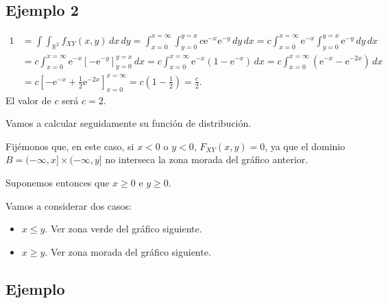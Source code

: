 \documentclass[]{book}
\begin{document}
\hypertarget{ejemplo-2-2}{%
\subsection{Ejemplo 2}\label{ejemplo-2-2}}

\[
\begin{array}{rl}
1 & =\int\int_{\mathbb{R}^2}f_{XY}(x,y)\, dx\, dy=\int_{x=0}^{x=\infty}\int_{y=0}^{y=x} c \mathrm{e}^{-x}\mathrm{e}^{-y} \, dy\, dx =c \int_{x=0}^{x=\infty}\mathrm{e}^{-x}\int_{y=0}^{y=x}\mathrm{e}^{-y}\, dy\, dx \\ & =
c \int_{x=0}^{x=\infty}\mathrm{e}^{-x}\left[-\mathrm{e}^{-y}\right]_{y=0}^{y=x}\, dx = c \int_{x=0}^{x=\infty}\mathrm{e}^{-x}\left(1-\mathrm{e}^{-x}\right)\, dx =c \int_{x=0}^{x=\infty}\left(\mathrm{e}^{-x}-\mathrm{e}^{-2x}\right)\, dx \\ & = c \left[-\mathrm{e}^{-x}+\frac{1}{2}\mathrm{e}^{-2x}\right]_{x=0}^{x=\infty} = c\left(1-\frac{1}{2}\right)=\frac{c}{2}.
\end{array}
\]
El valor de \(c\) será \(c=2\).

Vamos a calcular seguidamente su función de distribución.

Fijémonos que, en este caso, si \(x<0\) o \(y<0\), \(F_{XY}(x,y)=0\), ya que el dominio \(B=(-\infty,x]\times (-\infty,y]\) no interseca la zona morada del gráfico anterior.

Suponemos entonces que \(x\geq 0\) e \(y\geq 0\).

Vamos a considerar dos casos:

\begin{itemize}
\item
  \(x\leq y\). Ver zona verde del gráfico siguiente.
\item
  \(x\geq y\). Ver zona morada del gráfico siguiente.
\end{itemize}

\hypertarget{ejemplo-52}{%
\subsection{Ejemplo}\label{ejemplo-52}}
\end{document}
